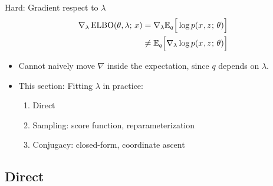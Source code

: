 \begin{frame}
Hard: Gradient respect to $\lambda$ 
\begin{align*}
\nabla_{\lambda} \operatorname*{ELBO}(\theta, \lambda ; \, x) &=  \nabla_\lambda \mathbb{E}_{ q}\Big[ \log p(x^{}, z^{} ; \, \theta) \Big] \\
&\ne \mathbb{E}_{q}\Big[\nabla_{\lambda} \log p(x^{}, z^{} ; \, \theta) \Big] 
\end{align*}
\pause
\begin{itemize}
    \item Cannot naively move $\nabla$ inside the expectation, since  $q$ depends on $\lambda$.
    \item This section: Fitting $\lambda$ in practice:
        \begin{enumerate}
        \item Direct 
        \item Sampling: score function, reparameterization
        \item Conjugacy: closed-form, coordinate ascent
    \end{enumerate}

\end{itemize}
\end{frame}


 

\subsection{Direct}

